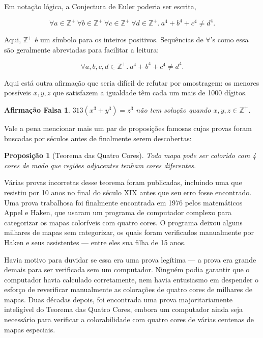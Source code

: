 \documentclass[12pt]{article}
\newtheorem{proposicao}{Proposição}[subsection]
\newtheorem*{afirmacaofalsa}{Afirmação Falsa}
\begin{document}
Em notação lógica, a Conjectura de Euler poderia ser escrita,

$$
	\forall a \in \mathbb{Z}^+ \ \forall b \in \mathbb{Z}^+ \ \forall c \in
	\mathbb{Z}^+ \ \forall d \in \mathbb{Z}^+ .\ a^4 + b^4 + c^4 \neq d^4.
$$

Aqui, $\mathbb{Z}^+$ é um símbolo para os inteiros positivos. Sequências de
$\forall$'s como essa são geralmente abreviadas para facilitar a leitura:

$$
	\forall a, b, c, d \in \mathbb{Z}^+ .\ a^4 + b^4 + c^4 \neq d^4.
$$

Aqui está outra afirmação que seria difícil de refutar por amostragem: os
menores possíveis $x, y, z$ que satisfazem a igualdade têm cada um mais de 1000
dígitos.

\begin{afirmacaofalsa}
	$313(x^3 + y^3) = z^3$ não tem solução quando $x, y, z \in \mathbb{Z}^+$.
\end{afirmacaofalsa}

Vale a pena mencionar mais um par de proposições famosas cujas provas foram
buscadas por séculos antes de finalmente serem descobertas:

\begin{proposicao}[Teorema das Quatro Cores]
	Todo mapa pode ser colorido com 4 cores de modo que regiões adjacentes tenham
	cores diferentes.
\end{proposicao}

Várias provas incorretas desse teorema foram publicadas, incluindo uma que
resistiu por 10 anos no final do século XIX antes que seu erro fosse
encontrado. Uma prova trabalhosa foi finalmente encontrada em 1976 pelos
matemáticos Appel e Haken, que usaram um programa de computador complexo para
categorizar os mapas coloríveis com quatro cores. O programa deixou alguns
milhares de mapas sem categorizar, os quais foram verificados manualmente por
Haken e seus assistentes --- entre eles sua filha de 15 anos.

Havia motivo para duvidar se essa era uma prova legítima --- a prova era grande
demais para ser verificada sem um computador. Ninguém podia garantir que o
computador havia calculado corretamente, nem havia entusiasmo em despender o
esforço de reverificar manualmente as colorações de quatro cores de milhares de
mapas. Duas décadas depois, foi encontrada uma prova majoritariamente
inteligível do Teorema das Quatro Cores, embora um computador ainda seja
necessário para verificar a colorabilidade com quatro cores de várias centenas
de mapas especiais.
\end{document}
